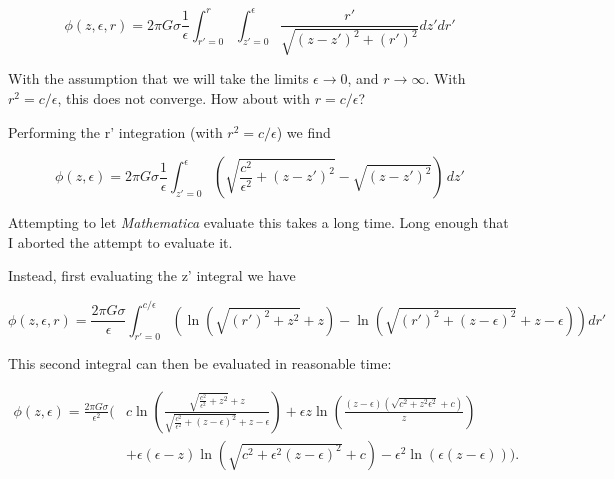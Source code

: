 \begin{equation}\label{eqn:InfinitePlanePotentialTakeIII:30}
\phi (z, \epsilon , r)= 2 \pi  G \sigma  \frac{1}{\epsilon }\int _{r' = 0}^r\int _{z' = 0}^{\epsilon }\frac{r'}{\sqrt{\left(z-z'\right)^2+\left(r'\right)^2}}dz'dr'
\end{equation}

With the assumption that we will take the limits $\epsilon \rightarrow 0$, and $r \rightarrow \infty$.  With $r^2 = c/\epsilon$, this does not converge.  How about with $r = c/\epsilon$?

Performing the r' integration (with $r^2 = c/\epsilon$) we find

\begin{equation}\label{eqn:InfinitePlanePotentialTakeIII:50}
\phi (z, \epsilon )= 2 \pi  G \sigma  \frac{1}{\epsilon }\int_{z' = 0}^{\epsilon } \left(\sqrt{\frac{c^2}{\epsilon ^2}+(z-z')^2}-\sqrt{(z-z')^2}\right) \, dz'
\end{equation}

Attempting to let \textit{Mathematica} evaluate this takes a long time.  Long enough that I aborted the attempt to evaluate it.

Instead, first evaluating the z' integral we have

\begin{equation}\label{eqn:InfinitePlanePotentialTakeIII:70}
\phi (z, \epsilon , r)=\frac{2 \pi  G \sigma }{\epsilon }
\int _{r' = 0}^{c/\epsilon }\left(\ln \left(\sqrt{\left(r'\right)^2+z^2}+z\right)-\ln \left(\sqrt{\left(r'\right)^2+(z-\epsilon )^2}+z-\epsilon \right)\right)
dr'
\end{equation}

This second integral can then be evaluated in reasonable time:

\begin{equation}\label{eqn:InfinitePlanePotentialTakeIII:90}
\begin{aligned}
\phi (z, \epsilon )
= 
\frac{2 \pi  G \sigma }{\epsilon ^2} 
\Biggl( 
&c \ln \left(\frac{\sqrt{\frac{c^2}{\epsilon ^2}+z^2}+z}{\sqrt{\frac{c^2}{\epsilon ^2}+(z-\epsilon )^2}+z-\epsilon }\right) 
+ \epsilon z \ln \left(\frac{(z-\epsilon ) \left(\sqrt{c^2+z^2 \epsilon ^2}+c\right)}{z}\right) \\
&+ \epsilon (\epsilon -z) \ln \left(\sqrt{c^2+\epsilon ^2 (z-\epsilon )^2}+c\right) 
- \epsilon^2  \ln (\epsilon  (z-\epsilon )) 
\Biggr).
\end{aligned}
\end{equation}

